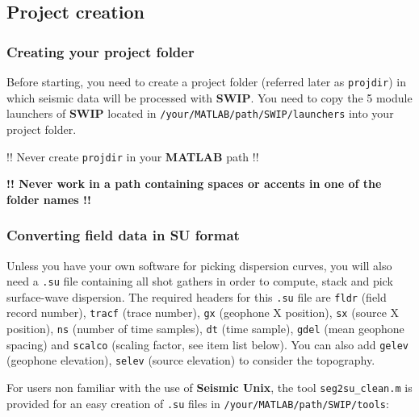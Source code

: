 \documentclass[twoside,a4paper]{article}
\def\SWIP{\textbf{SWIP}}
\def\SeismicUnix{\textbf{Seismic Unix}}
\def\MATLAB{\textbf{MATLAB}}
\begin{document}
\subsection{Project creation}
\subsubsection{Creating your project folder}
Before starting, you need to create a project folder (referred later as \verb|projdir|) in which seismic data will be processed with {\SWIP}. You need to copy the 5 module launchers of {\SWIP} located in \verb|/your/MATLAB/path/SWIP/launchers| into your project folder.

!! Never create \verb|projdir| in your {\MATLAB} path !!

\textbf{!! Never work in a path containing spaces or accents in one of the folder names !!}

\subsubsection{Converting field data in SU format}
\label{sec:seg2su}
Unless you have your own software for picking dispersion curves, you will also need a \verb|.su| file containing all shot gathers in order to compute, stack and pick surface-wave dispersion. The required headers for this \verb|.su| file are \verb|fldr| (field record number), \verb|tracf| (trace number), \verb|gx| (geophone X position), \verb|sx| (source X position), \verb|ns| (number of time samples), \verb|dt| (time sample), \verb|gdel| (mean geophone spacing) and \verb|scalco| (scaling factor, see item list below). You can also add \verb|gelev| (geophone elevation), \verb|selev| (source elevation) to consider the topography. 

For users non familiar with the use of {\SeismicUnix}, the tool \verb|seg2su_clean.m| is provided for an easy creation of \verb|.su| files in \verb|/your/MATLAB/path/SWIP/tools|:
\end{document}
